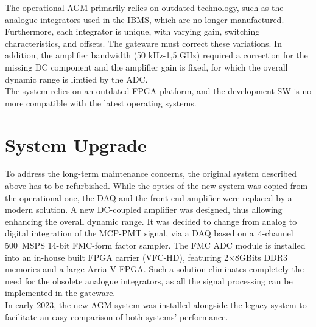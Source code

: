 The operational AGM primarily relies on outdated   technology, such as  the analogue integrators used in the IBMS,  which are no longer manufactured.
%
Furthermore, each integrator is unique, with varying gain, switching characteristics, and offsets. The gateware must correct these variations.
%
%
%
In addition, the amplifier bandwidth (50 kHz-1,5 GHz) %
required a correction for the missing DC component and the amplifier gain is fixed,  for which  the overall dynamic range is limtied by the ADC. 
%
\\
The system relies on an outdated FPGA platform, and the development SW is no more compatible with the latest operating systems. 

\section{System Upgrade}
To address the long-term maintenance concerns, the original system described above has to be refurbished. 
%
While the optics of the new system was copied from the operational one, the DAQ and the front-end amplifier were replaced by a modern solution.
%
A new DC-coupled amplifier was designed, thus allowing enhancing the overall dynamic range. 
%
It was decided to change from analog to digital integration of the MCP-PMT signal, via a DAQ based on  a~4-channel \SI{500}{MSPS} 14-bit FMC-form factor sampler.
%
The FMC ADC module is installed into an in-house built FPGA carrier (VFC-HD), featuring 2$\times 8$GBits DDR3 memories and a large Arria V FPGA.
%
Such a solution eliminates completely the need for the obsolete analogue integrators, as all the signal processing can be implemented in the gateware.
\\
In early 2023, the new AGM system was installed alongside the legacy system to facilitate an easy comparison of both systems' performance.

